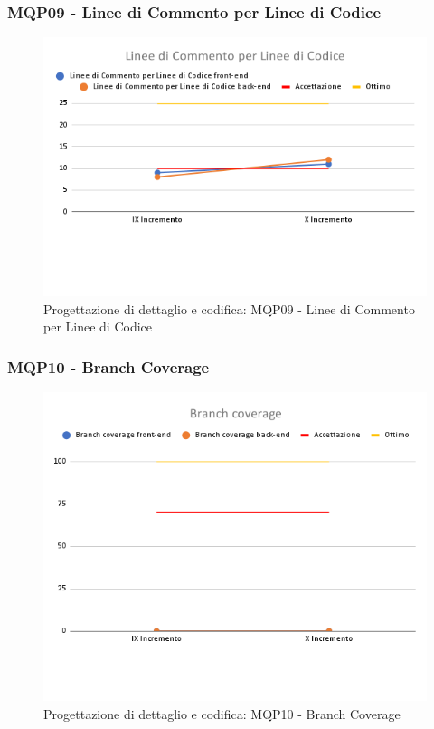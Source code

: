 \subsubsection{MQP09 - Linee di Commento per Linee di Codice}
\begin{figure}[H]
    \centering
    \includegraphics[scale=0.50]{Sezioni/images/last_prodotto/Linee_di_Commento_per Linee_di_Codice.png}
    \caption{Progettazione di dettaglio e codifica: MQP09 - Linee di Commento per Linee di Codice}
\end{figure}
\subsubsection{MQP10 - Branch Coverage}
\begin{figure}[H]
    \centering
    \includegraphics[scale=0.50]{Sezioni/images/last_prodotto/Branch_coverage.png}
    \caption{Progettazione di dettaglio e codifica: MQP10 - Branch Coverage}
\end{figure}
